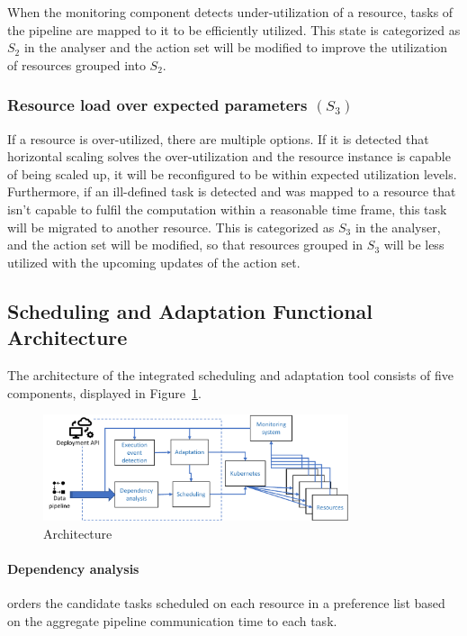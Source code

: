  When the monitoring component detects under-utilization of a resource, tasks of the pipeline are mapped to it to be efficiently utilized. This state is categorized as $S_2$ in the analyser and the action set will be modified to improve the utilization of resources grouped into $S_2$. 

  \subsubsection*{Resource load over expected parameters $(S_3)$} 

  If a resource is over-utilized, there are multiple options. If it is detected that horizontal scaling solves the over-utilization and the resource instance is capable of being scaled up, it will be reconfigured to be within expected utilization levels. Furthermore, if an ill-defined task is detected and was mapped to a resource that isn't capable to fulfil the computation within a reasonable time frame, this task will be migrated to another resource. 
  This is categorized as $S_3$ in the analyser, and the action set will be modified, so that resources grouped in $S_3$ will be less utilized with the upcoming updates of the action set. \cite{kimovskiBigDataPipeline2022}


  \subsection{Scheduling and Adaptation Functional Architecture}
    The architecture of the integrated \SAA{} scheduling and adaptation tool consists of five components, displayed in Figure~\ref{fig:data-cloud-architecture}.

    \begin{figure}
        \centering
        \includegraphics[width=0.8\textwidth]{pdf/data_cloud_arch.pdf}
        \caption{\SAA Architecture}
        \label{fig:data-cloud-architecture}
    \end{figure}

    \paragraph{Dependency analysis } orders the candidate tasks scheduled on each resource in a preference list based on the aggregate pipeline communication time to each task.

